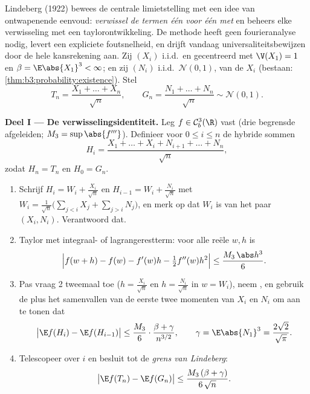 \begin{problem}
\label{pb:b3:clt:1}
Lindeberg (1922) bewees de centrale limietstelling met een idee
van ontwapenende eenvoud: \emph{verwissel de termen één voor één
met } en beheers elke verwisseling met een
taylorontwikkeling. De methode heeft geen fourieranalyse nodig,
levert een expliciete foutsnelheid, en drijft vandaag
universaliteitsbewijzen door de hele kansrekening aan. Zij
$(X_i)$ i.i.d.\ en gecentreerd met $\V(X_1) = 1$ en $\beta =
\E\abs{X_1}^3 < \infty$; en zij $(N_i)$ i.i.d.\ $\mathcal
N(0,1)$,  van de $X_i$ (bestaan:
\cref{thm:b3:probability:existence}). Stel
\[
T_n = \frac{X_1 + \dots + X_n}{\sqrt n},
\qquad
G_n = \frac{N_1 + \dots + N_n}{\sqrt n} \sim \mathcal N(0,1).
\]

\medskip
\noindent\textbf{Deel I --- De verwisselingsidentiteit.} Leg $f
\in \mathcal C^3_b(\R)$ vast (drie begrensde  afgeleiden;
$M_3 = \sup\abs{f'''}$). Definieer voor $0 \leq i \leq n$ de
hybride sommen
\[
H_i = \frac{X_1 + \dots + X_i + N_{i+1} + \dots +
N_n}{\sqrt n},
\]
zodat $H_n = T_n$ en $H_0 = G_n$.
\begin{enumerate}
  \item Schrijf $H_i = W_i + \frac{X_i}{\sqrt n}$ en $H_{i-1} =
        W_i + \frac{N_i}{\sqrt n}$ met $W_i =
        \frac{1}{\sqrt n}\bigl(\sum_{j<i}X_j +
        \sum_{j>i}N_j\bigr)$, en merk op dat $W_i$ 
        is van het paar $(X_i, N_i)$. Verantwoord dat.
  \item Taylor met integraal- of lagrangerestterm: voor alle
        reële $w, h$ is
        \[
        \Bigl|f(w + h) - f(w) - f'(w)h -
        \tfrac12f''(w)h^2\Bigr| \leq
        \frac{M_3\,\abs h^3}{6} .
        \]
  \item Pas vraag 2 tweemaal toe ($h = \frac{X_i}{\sqrt n}$ en $h
        = \frac{N_i}{\sqrt n}$ in $w = W_i$), neem
        , en gebruik de  plus
        het samenvallen van de eerste twee momenten van $X_i$ en
        $N_i$ om aan te tonen dat
        \[
        \bigl|\E f(H_i) - \E f(H_{i-1})\bigr|
        \leq \frac{M_3}{6}\cdot
        \frac{\beta + \gamma}{n^{3/2}},
        \qquad \gamma = \E\abs{N_1}^3 =
        \frac{2\sqrt2}{\sqrt\pi} .
        \]
  \item Telescopeer over $i$ en besluit tot de \emph{grens van
        Lindeberg}:
        \[
        \bigl|\E f(T_n) - \E f(G_n)\bigr| \leq
        \frac{M_3\,(\beta + \gamma)}{6\,\sqrt n} .
        \]
\end{enumerate}


\end{problem}
